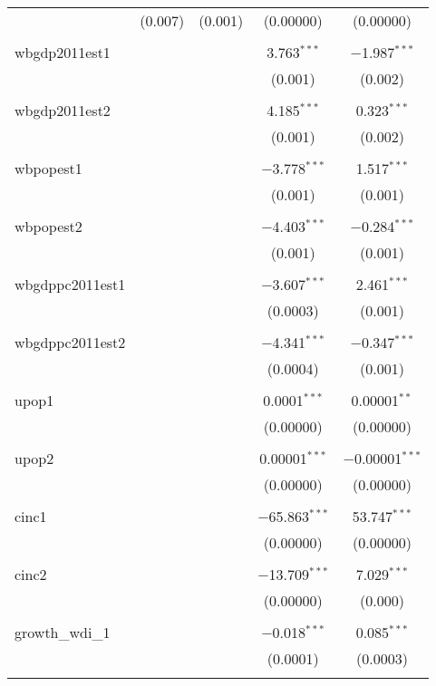 \begin{table}[!htbp]
\begin{tabular}{@{\extracolsep{5pt}}lcccc}
  & (0.007) & (0.001) & (0.00000) & (0.00000) \\ 
  & & & & \\ 
 wbgdp2011est1 &  &  & 3.763$^{***}$ & $-$1.987$^{***}$ \\ 
  &  &  & (0.001) & (0.002) \\ 
  & & & & \\ 
 wbgdp2011est2 &  &  & 4.185$^{***}$ & 0.323$^{***}$ \\ 
  &  &  & (0.001) & (0.002) \\ 
  & & & & \\ 
 wbpopest1 &  &  & $-$3.778$^{***}$ & 1.517$^{***}$ \\ 
  &  &  & (0.001) & (0.001) \\ 
  & & & & \\ 
 wbpopest2 &  &  & $-$4.403$^{***}$ & $-$0.284$^{***}$ \\ 
  &  &  & (0.001) & (0.001) \\ 
  & & & & \\ 
 wbgdppc2011est1 &  &  & $-$3.607$^{***}$ & 2.461$^{***}$ \\ 
  &  &  & (0.0003) & (0.001) \\ 
  & & & & \\ 
 wbgdppc2011est2 &  &  & $-$4.341$^{***}$ & $-$0.347$^{***}$ \\ 
  &  &  & (0.0004) & (0.001) \\ 
  & & & & \\ 
 upop1 &  &  & 0.0001$^{***}$ & 0.00001$^{**}$ \\ 
  &  &  & (0.00000) & (0.00000) \\ 
  & & & & \\ 
 upop2 &  &  & 0.00001$^{***}$ & $-$0.00001$^{***}$ \\ 
  &  &  & (0.00000) & (0.00000) \\ 
  & & & & \\ 
 cinc1 &  &  & $-$65.863$^{***}$ & 53.747$^{***}$ \\ 
  &  &  & (0.00000) & (0.00000) \\ 
  & & & & \\ 
 cinc2 &  &  & $-$13.709$^{***}$ & 7.029$^{***}$ \\ 
  &  &  & (0.00000) & (0.000) \\ 
  & & & & \\ 
 growth\_wdi\_1 &  &  & $-$0.018$^{***}$ & 0.085$^{***}$ \\ 
  &  &  & (0.0001) & (0.0003) \\ 
  & & & & \\ 

\end{tabular}
\end{table}
